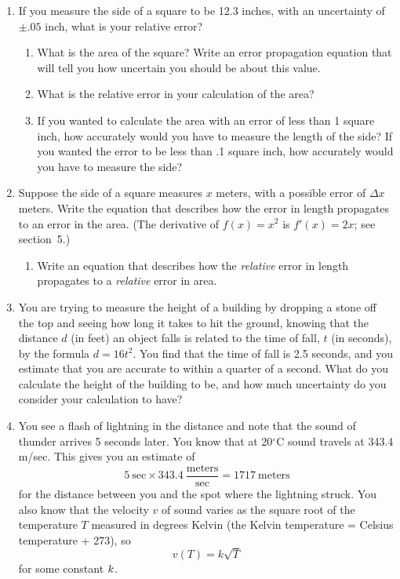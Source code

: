 \begin{enumerate}
\item If you measure the side of a square to be 12.3 inches, with an
uncertainty of $\pm.05$ inch, what is your relative error?

  \begin{enumerate}
  \item What is the area of the square?  Write an error propagation
equation that will tell you how uncertain you should be about this
value.

  \item What is the relative error in your calculation of the area?

  \item If you wanted to calculate the area with an error of less than 1
square inch, how accurately would you have to measure the length of
the side?  If you wanted the error to be less than .1 square inch, how
accurately would you have to measure the side?


\end{enumerate}
\item Suppose the side of a square measures $x$ meters, with a
possible error of $\Delta x$ meters.  Write the equation that
describes how the error in length propagates to an error in the area.
(The derivative of $f(x) = x^2$ is $f'(x) = 2x$; see section~5.)


  \begin{enumerate}
  \item Write an equation that describes how the {\em relative\/} error
in length propagates to a {\em relative\/} error in area.



\end{enumerate}
\item You are trying to measure the height of a building by dropping a
stone off the top and seeing how long it takes to hit the ground,
knowing that the distance $d$ (in feet) an object falls is related to
the time of fall, $t$ (in seconds), by the formula $d =16t^2$.  You
find that the time of fall is 2.5 seconds, and you estimate that you
are accurate to within a quarter of a second.  What do you calculate
the height of the building to be, and how much uncertainty do you
consider your calculation to have?


\item You see a flash of lightning in the distance and note that the
sound of thunder arrives 5 seconds later.  You know that at
20$^\circ$C sound travels at 343.4 m/sec.  This gives you an estimate
of
\[
5 \ \mbox{sec} \times 
		343.4 \ \frac{\mbox{meters}}{\mbox{sec}} 
		= 1717 \ \mbox{meters} 
\]
for the distance between you and the spot where the lightning struck.
You also know that the velocity $v$ of sound varies as the square root
of the temperature $T$ measured in degrees Kelvin (the Kelvin
temperature = Celsius temperature + 273), so
	\[
v(T) = k \sqrt{T}
\]
for some constant $k\/$.


\end{enumerate}
